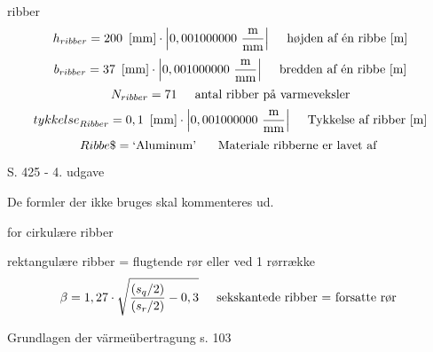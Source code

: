 \documentclass[../Hovedrapport.tex]{subfiles}
\newcommand{\SC}[1]{\mbox{`#1'}\  }
\newcommand{\V}[1]{\mbox{$ #1 $}}
\newcommand{\I}{\mbox{\hspace{0.20in}}}
\begin{document}
\vspace{0.10in}
\noindent
\rm ribber
\begin{equation}
\label{EES Eqn:19}
h_{ribber} = 200   \   \left[ \rm mm \right] \cdot  \rm { \left|0,001000000\ \frac {\rm{m}}{\rm{mm}}\right|}	 
\mbox{\I højden af én ribbe [m]}
\end{equation}
\begin{equation}
\label{EES Eqn:20}
b_{ribber} = 37   \   \left[ \rm mm \right] \cdot  \rm { \left|0,001000000\ \frac {\rm{m}}{\rm{mm}}\right|}	 
\mbox{\I bredden af én ribbe [m]}
\end{equation}
\begin{equation}
\label{EES Eqn:21}
N_{ribber} = 71	 
\mbox{\I antal ribber på varmeveksler}
\end{equation}
\begin{equation}
\label{EES Eqn:22}
\V{tykkelse} _{Ribber} = 0,1   \   \left[ \rm mm \right] \cdot  \rm { \left|0,001000000\ \frac {\rm{m}}{\rm{mm}}\right|}	 
\mbox{\I Tykkelse af ribber [m]}
\end{equation}
\begin{equation}
\label{EES Eqn:23}
Ribbe\$ = \SC{Aluminum}	 
\mbox{\I Materiale ribberne er lavet af }
\end{equation}

\vspace{0.10in}
\noindent
\rm S. 425 - 4. udgave

\vspace{0.10in}
\noindent
\rm De formler der ikke bruges skal kommenteres ud.

\vspace{0.10in}
\noindent
\rm for cirkulære ribber

\vspace{0.10in}
\noindent
\rm rektangulære ribber = flugtende rør eller ved 1 rørrække
\begin{equation}
\label{EES Eqn:24}
\beta = 1,27 \cdot  \sqrt{  \frac { \left( s_{q}/2 \right) }{  \left( s_{r}/2 \right)  }- 0,3  }	 
\mbox{\I sekskantede ribber = forsatte rør }
\end{equation}

\vspace{0.10in}
\noindent
\rm Grundlagen der värmeübertragung s. 103
\end{document}
